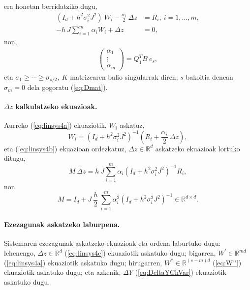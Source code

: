 era honetan berridatziko dugu,
\begin{align}
\label{eq:linsys4a}
(I_d+h^2\sigma_i^2J^2) \ W_i- \frac{\alpha_i}{2}\ \Delta z &=R_i, \ i=1,\dots,m,\\
\label{eq:linsys4b}
-h \ J \sum\limits_{i=1}^{m} \alpha_i W_i+\Delta z &=0,
\end{align}
non,
\begin{align*}
\left(
\begin{matrix}
\alpha_1 \\
\vdots \\
\alpha_m
\end{matrix}
\right)=Q_1^TB \ e_s,
\end{align*}
eta $\sigma_1 \geqslant \cdots \geqslant \sigma_{s/2}, \ K$ matrizearen balio singularrak diren; $s$ bakoitia denean $\sigma_m=0$ dela gogoratu (\ref{eq:Dmat}). 

\paragraph*{$\Delta z$ kalkulatzeko ekuazioak.}

Aurreko (\ref{eq:linsys4a}) ekuaziotik, $W_i$ askatuz, 
\begin{equation*}
W_i=(I_d+h^2\sigma_i^2J^2)^{-1} (R_i+\frac{\alpha_i}{2} \ \Delta z),
\end{equation*}
%
eta (\ref{eq:linsys4b}) ekuazioan ordezkatuz, $\Delta z \in \mathbb{R}^d$ askatzeko ekuazioak lortuko ditugu,
\begin{equation}
\label{eq:linsys4c}
M\ \Delta z=h \ J\sum\limits_{i=1}^{m}\alpha_i (I_d+h^2\sigma_i^2J^2)^{-1}R_i,
\end{equation}
non
\begin{equation}M=I_d+ J \ \frac{h}{2}\ \sum\limits_{i=1}^{m} \alpha_i^2 (I_d+h^2 \sigma_i^2 J^2)^{-1} \in \mathbb{R}^{d \times d}.
\end{equation}

\paragraph*{Ezezagunak askatzeko laburpena.}

Sistemaren ezezagunak askatzeko ekuazioak eta ordena laburtuko dugu: lehenengo, $\Delta z \in \mathbb{R}^{d}$  (\ref{eq:linsys4c}) ekuaziotik askatuko dugu; bigarren,  $W^{'} \in \mathbb{R}^{md}$ (\ref{eq:linsys4a}) ekuaziotik askatuko dugu; hirugarren, $W^{''} \in \mathbb{R}^{(s-m)d}$ (\ref{eq:W''}) ekuaziotik askatuko dugu; eta azkenik, $\Delta Y$ (\ref{eq:DeltaYChVar}) ekuaziotik askatuko dugu.


